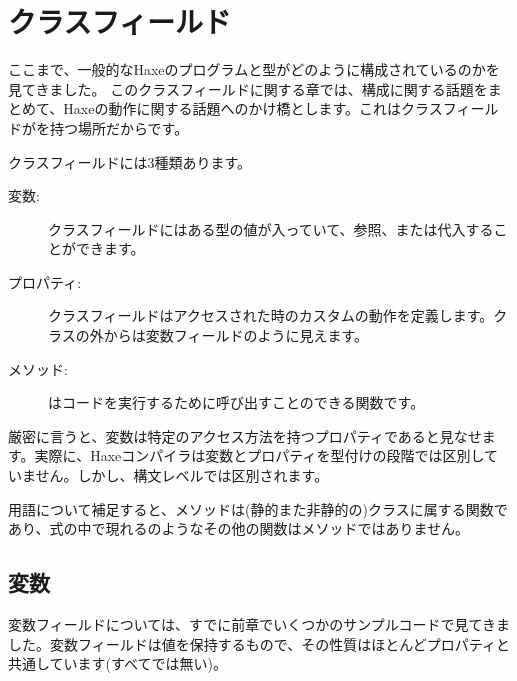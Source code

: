 \chapter{クラスフィールド}
\label{class-field}


ここまで、一般的なHaxeのプログラムと型がどのように構成されているのかを見てきました。
このクラスフィールドに関する章では、構成に関する話題をまとめて、Haxeの動作に関する話題へのかけ橋とします。これはクラスフィールドがを持つ場所だからです。

クラスフィールドには3種類あります。

\begin{description}
	\item[変数:] クラスフィールドにはある型の値が入っていて、参照、または代入することができます。
	\item[プロパティ:] クラスフィールドはアクセスされた時のカスタムの動作を定義します。クラスの外からは変数フィールドのように見えます。
	\item[メソッド:] はコードを実行するために呼び出すことのできる関数です。
\end{description}

厳密に言うと、変数は特定のアクセス方法を持つプロパティであると見なせます。実際に、Haxeコンパイラは変数とプロパティを型付けの段階では区別していません。しかし、構文レベルでは区別されます。

用語について補足すると、メソッドは(静的また非静的の)クラスに属する関数であり、式の中で現れるのようなその他の関数はメソッドではありません。

\section{変数}
\label{class-field-variable}

変数フィールドについては、すでに前章でいくつかのサンプルコードで見てきました。変数フィールドは値を保持するもので、その性質はほとんどプロパティと共通しています(すべてでは無い)。


